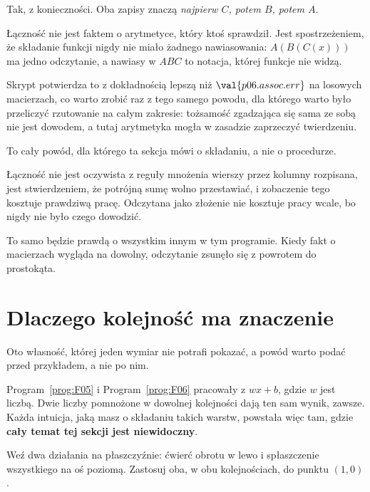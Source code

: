 \begin{fr}
\begin{ansblock}
Tak, z konieczności. Oba zapisy znaczą \emph{najpierw $C$, potem $B$, potem
$A$}.
\end{ansblock}

Łączność nie jest faktem o arytmetyce, który ktoś sprawdził. Jest
spostrzeżeniem, że składanie funkcji nigdy nie miało żadnego nawiasowania:
$A(B(C(x)))$ ma jedno odczytanie, a nawiasy w $ABC$ to notacja, której funkcje
nie widzą.

Skrypt potwierdza to z dokładnością lepszą niż $\val{p06.assoc.err}$ na
losowych macierzach, co warto zrobić raz z tego samego powodu, dla którego warto było
przeliczyć rzutowanie na całym zakresie: tożsamość zgadzająca się sama ze sobą
nie jest dowodem, a tutaj arytmetyka mogła w zasadzie zaprzeczyć twierdzeniu.
\end{fr}

\begin{fr}
\begin{note}
To cały powód, dla którego ta sekcja mówi o składaniu, a nie o procedurze.

Łączność nie jest oczywista z reguły mnożenia wierszy przez kolumny \dash{}
rozpisana, jest stwierdzeniem, że potrójną sumę wolno przestawiać, i zobaczenie
tego kosztuje prawdziwą pracę. Odczytana jako złożenie nie kosztuje pracy
wcale, bo nigdy nie było czego dowodzić.

To samo będzie prawdą o wszystkim innym w tym programie. Kiedy fakt o
macierzach wygląda na dowolny, odczytanie zsunęło się z powrotem do prostokąta.
\end{note}
\end{fr}

\section{Dlaczego kolejność ma znaczenie}
\label{sec:P06-order}

\begin{fr}
Oto własność, której jeden wymiar nie potrafi pokazać, a powód warto podać
przed przykładem, a nie po nim.

Program~\ref{prog:F05} i Program~\ref{prog:F06} pracowały z $wx + b$, gdzie $w$
jest liczbą. Dwie liczby pomnożone w dowolnej kolejności dają ten sam wynik,
zawsze. Każda intuicja, jaką masz o składaniu takich warstw, powstała więc tam,
gdzie \textbf{cały temat tej sekcji jest niewidoczny}.

Weź dwa działania na płaszczyźnie: ćwierć obrotu w lewo i spłaszczenie
wszystkiego na oś poziomą. Zastosuj oba, w obu kolejnościach, do punktu
$(1, 0)$.
\dotline
\nextframe
\end{fr}

